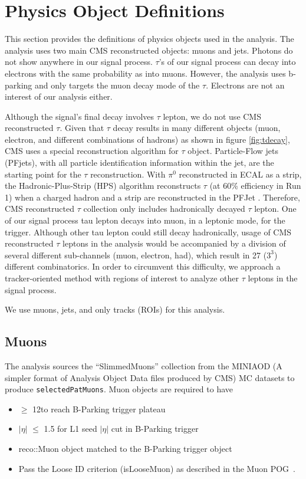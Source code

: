 \clearpage
\chapter{Physics Object Definitions}\label{sec:objects}

This section provides the definitions of physics objects used in the analysis.
The analysis uses two main CMS reconstructed objects: muons and jets.
Photons do not show anywhere in our signal process.
$\tau$'s of our signal process can decay into electrons with the same probability as into muons.
However, the analysis uses b-parking and only targets the muon decay mode of the $\tau$.
Electrons are not an interest of our analysis either.

Although the signal's final decay involves $\tau$ lepton, we do not use CMS reconstructed $\tau$.
Given that $\tau$ decay results in many different objects (muon, electron, and different combinations of hadrons) as shown in figure \ref{fig:tdecay}, CMS uses a special reconstruction algorithm for $\tau$ object.
Particle-Flow jets (PFjets), with all particle identification information within the jet, are the starting point for the $\tau$ reconstruction.
With $\pi^{0}$ reconstructed in ECAL as a strip, the Hadronic-Plus-Strip (HPS) algorithm reconstructs $\tau$ (at 60\% efficiency in Run 1) when a charged hadron and a strip are reconstructed in the PFJet \cite{HPS}.
Therefore, CMS reconstructed $\tau$ collection only includes hadronically decayed $\tau$ lepton.
One of our signal process tau lepton decays into muon, in a leptonic mode, for the trigger.
Although other tau lepton could still decay hadronically, usage of CMS reconstructed $\tau$ leptons in the analysis would be accompanied by a division of several different sub-channels (muon, electron, had), which result in 27 ($3^{3}$) different combinatorics.
In order to circumvent this difficulty, we approach a tracker-oriented method with regions of interest to analyze other $\tau$ leptons in the signal process.

We use muons, jets, and only tracks (ROIs) for this analysis.
\section{Muons}\label{sec:muons}
The analysis sources the ``SlimmedMuons'' collection from the MINIAOD (A simpler format of Analysis Object Data files produced by CMS) MC datasets to produce {\tt selectedPatMuons}.
Muon objects are required to have 
\begin{itemize}
  \item \pt $\geq$ 12\GeV to reach B-Parking trigger plateau
  \item $|\eta|$ $\leq$ 1.5 for L1 seed $|\eta|$ cut in B-Parking trigger
  \item reco::Muon object matched to the B-Parking trigger object
  \item Pass the Loose ID criterion (isLooseMuon) as described in the Muon POG~\cite{muonpog}.
\end{itemize}

